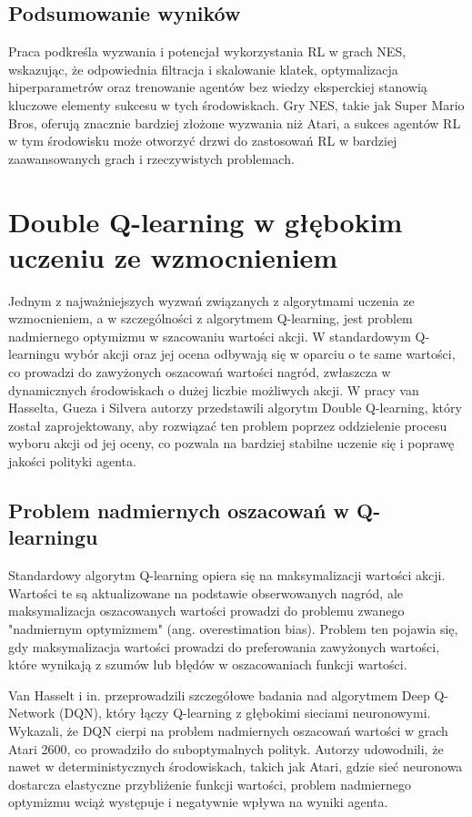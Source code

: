 \subsection{Podsumowanie wyników}
Praca \cite{NES} podkreśla wyzwania i potencjał wykorzystania RL w grach NES, wskazując, że odpowiednia filtracja i skalowanie klatek, optymalizacja hiperparametrów oraz trenowanie agentów bez wiedzy eksperckiej stanowią kluczowe elementy sukcesu w tych środowiskach. Gry NES, takie jak Super Mario Bros, oferują znacznie bardziej złożone wyzwania niż Atari, a sukces agentów RL w tym środowisku może otworzyć drzwi do zastosowań RL w bardziej zaawansowanych grach i rzeczywistych problemach.

\section{Double Q-learning w głębokim uczeniu ze wzmocnieniem}

Jednym z najważniejszych wyzwań związanych z algorytmami uczenia ze wzmocnieniem, a w szczególności z algorytmem Q-learning, jest problem nadmiernego optymizmu w szacowaniu wartości akcji. W standardowym Q-learningu wybór akcji oraz jej ocena odbywają się w oparciu o te same wartości, co prowadzi do zawyżonych oszacowań wartości nagród, zwłaszcza w dynamicznych środowiskach o dużej liczbie możliwych akcji. W pracy van Hasselta, Gueza i Silvera \cite{DQ} autorzy przedstawili algorytm Double Q-learning, który został zaprojektowany, aby rozwiązać ten problem poprzez oddzielenie procesu wyboru akcji od jej oceny, co pozwala na bardziej stabilne uczenie się i poprawę jakości polityki agenta.

\subsection{Problem nadmiernych oszacowań w Q-learningu}
Standardowy algorytm Q-learning opiera się na maksymalizacji wartości akcji. Wartości te są aktualizowane na podstawie obserwowanych nagród, ale maksymalizacja oszacowanych wartości prowadzi do problemu zwanego "nadmiernym optymizmem" (ang. overestimation bias). Problem ten pojawia się, gdy maksymalizacja wartości prowadzi do preferowania zawyżonych wartości, które wynikają z szumów lub błędów w oszacowaniach funkcji wartości.

Van Hasselt i in. \cite{DQ} przeprowadzili szczegółowe badania nad algorytmem Deep Q-Network (DQN), który łączy Q-learning z głębokimi sieciami neuronowymi. Wykazali, że DQN cierpi na problem nadmiernych oszacowań wartości w grach Atari 2600, co prowadziło do suboptymalnych polityk. Autorzy udowodnili, że nawet w deterministycznych środowiskach, takich jak Atari, gdzie sieć neuronowa dostarcza elastyczne przybliżenie funkcji wartości, problem nadmiernego optymizmu wciąż występuje i negatywnie wpływa na wyniki agenta.

